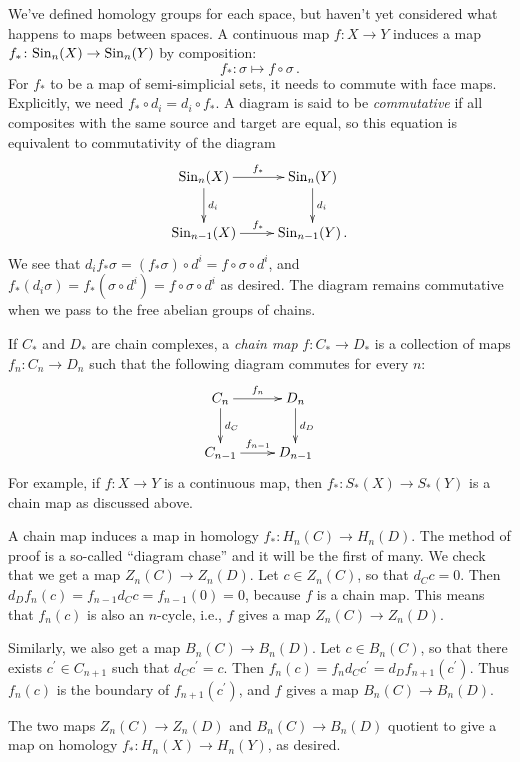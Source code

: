 We've defined homology groups for each space, but haven't yet considered what happens to maps between spaces. A continuous map $f\colon X\to Y$ induces a map $f_\ast\colon \mathrm{Sin}_n(X)\to\mathrm{Sin}_n(Y)$ by composition: 
\[
f_\ast:\sigma\mapsto f\circ \sigma\,.
\] 
For $f_\ast$ to be a map of semi-simplicial sets, it needs to commute with face maps. Explicitly, we need $f_\ast \circ d_i = d_i \circ f_\ast$. A diagram is said to be \emph{commutative} if all composites with the same source and target are equal, so this equation is equivalent to commutativity of the diagram
\begin{eqnarray*}
\xymatrix{\Sin_n(X)\ar[r]^{f_\ast}\ar[d]^{d_i} & \Sin_n(Y)\ar[d]^{d_i}\\
\Sin_{n-1}(X)\ar[r]^{f_\ast} & \Sin_{n-1}(Y)\,.}
\end{eqnarray*}
We see that $d_if_\ast\sigma=(f_\ast\sigma)\circ d^i=f\circ\sigma\circ d^i$, and $f_\ast(d_i\sigma)=f_\ast(\sigma\circ d^i)=f\circ\sigma\circ d^i$ as desired. The diagram remains commutative when we pass to the free abelian groups of chains.

If $C_\ast$ and $D_\ast$ are chain complexes, a \emph{chain map} $f\colon C_\ast\to D_\ast$ is a collection of maps $f_n\colon C_n\to D_n$ such that the following diagram commutes for every $n$:
\begin{equation*}
    \xymatrix{
	C_n\ar[r]^{f_n}\ar[d]^{d_C} & D_n\ar[d]^{d_D}\\
	C_{n-1}\ar[r]^{f_{n-1}} & D_{n-1}
    }
\end{equation*}
For example, if $f\colon X\to Y$ is a continuous map, then $f_\ast \colon S_\ast(X)\to S_\ast(Y)$ is a chain map as discussed above.

A chain map induces a map in homology $f_\ast: H_n(C)\to H_n(D)$. The method of proof is a so-called ``diagram chase'' and it will be the first of many. We check that we get a map $Z_n(C)\to Z_n(D)$. Let $c\in Z_n(C)$, so that $d_C c = 0$. Then $d_D f_n(c) = f_{n-1}d_C c = f_{n-1}(0) = 0$, because $f$ is a chain map. This means that $f_n(c)$ is also an $n$-cycle, i.e., $f$ gives a map $Z_n(C)\to Z_n(D)$.

Similarly, we also get a map $B_n(C)\to B_n(D)$. Let $c\in B_n(C)$, so that there exists $c^\prime \in C_{n+1}$ such that $d_C c^\prime = c$. Then $f_n(c) = f_nd_C c^\prime = d_D f_{n+1}(c^\prime)$. Thus $f_n(c)$ is the boundary of $f_{n+1}(c^\prime)$, and $f$ gives a map $B_n(C)\to B_n(D)$.

The two maps $Z_n(C)\to Z_n(D)$ and $B_n(C)\to B_n(D)$ quotient to give a map on homology $f_\ast: H_n(X)\to H_n(Y)$, as desired.
